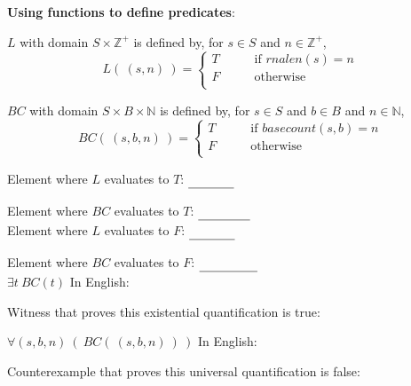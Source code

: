 
{\bf Using functions to define predicates}:

$L$ with domain $S \times \mathbb{Z}^+$ is defined by, for $s \in S$ and $n \in \mathbb{Z}^+$,
\[
L( ~(s, n)~) = \begin{cases}
T &\qquad\text{if $rnalen(s) = n$}\\
F &\qquad\text{otherwise}\\
\end{cases}
\]

$BC$ with domain $S \times B \times \mathbb{N}$ is defined by, for $s \in S$ and $b \in B$ and $n \in \mathbb{N}$,
\[
BC(~(s, b, n)~) = \begin{cases}
T &\qquad\text{if $basecount(s,b) = n$}\\
F &\qquad\text{otherwise}\\
\end{cases}
\]


Element where $L$ evaluates to $T$: $\underline{\phantom{(\A, 1)\hspace{0.2in}}}$

Element where $BC$ evaluates to $T$: $\underline{\phantom{(\A, \A1)\hspace{0.2in}}}$ \\

Element where $L$ evaluates to $F$: $\underline{\phantom{(\A, 2)\hspace{0.2in}}}$ 

Element where $BC$ evaluates to $F$: $\underline{\phantom{(\A, \C, 1)\hspace{0.2in}}}$ \\


$\exists t ~BC(t)$ \qquad In English: \underline{\phantom{There exists an ordered $3$-tuple 
at which the predicate $BC$ evaluates to $T$.}}

Witness that proves this existential quantification is true: \underline{\phantom{$(\G\G, \G, 2)$ or $(\G\A\U\G, \G, 2)$)}}

$\forall (s,b,n) ~(~BC(~(s,b,n)~)~)$  \qquad In English: \underline{\phantom{For all ordered $3$-tuples
the predicate $BC$ evaluates to $T$.}}

Counterexample that proves this universal quantification is false: \underline{\phantom{$(\G\G, \A, 2)$ or $(\G\A\U\G, \G, 3)$)}}

